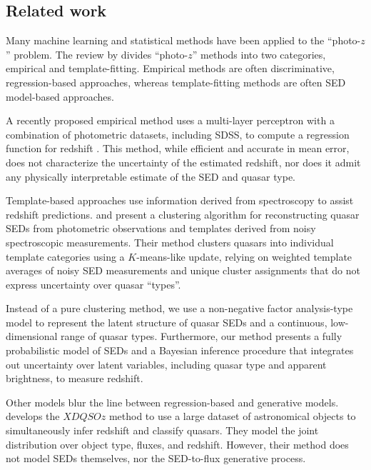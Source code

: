 \documentclass{article} %
\begin{document}
\subsection{Related work}
Many machine learning and statistical methods have been applied to the ``photo-$z$'' problem. The review by \cite{walcher2011fitting} divides ``photo-$z$'' methods into two categories, empirical and template-fitting.  Empirical methods are often discriminative, regression-based approaches, whereas template-fitting methods are often SED model-based approaches.  

A recently proposed empirical method uses a multi-layer perceptron with a combination of photometric datasets, including SDSS, 
to compute a regression function for redshift \cite{brescia2013photometric}. 
This method, while efficient and accurate in mean error, does not characterize the uncertainty of the estimated redshift, nor does it admit any physically interpretable estimate of the SED and quasar type.  

Template-based approaches use information derived from spectroscopy to assist redshift predictions.  
\cite{budavari2001photometric} and \cite{richards2001photometric} present a clustering algorithm for reconstructing quasar SEDs from photometric observations and templates derived from noisy spectroscopic measurements.  
Their method clusters quasars into individual template categories using a $K$-means-like update, relying on weighted template averages of noisy SED measurements and unique cluster assignments that do not express uncertainty over quasar ``types''. 

Instead of a pure clustering method, we use a non-negative factor analysis-type model to represent the latent structure of quasar SEDs and a continuous, low-dimensional range of quasar types.  
Furthermore, our method presents a fully probabilistic model of SEDs and a Bayesian inference procedure that integrates out uncertainty over latent variables, including quasar type and apparent brightness, to measure redshift.    

Other models blur the line between regression-based and generative models. \cite{bovy2012photometric} develops the $XDQSOz$ method to use a large dataset of astronomical objects to simultaneously infer redshift and classify quasars.  
They model the joint distribution over object type, fluxes, and redshift.  However, their method does not model SEDs themselves, nor the SED-to-flux generative process. 
\end{document}
